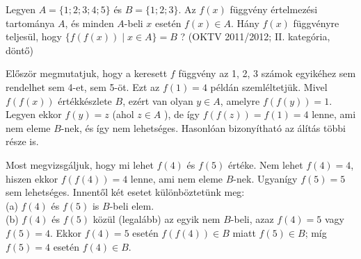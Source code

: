 \begin{extraproblem}
	Legyen $A=\{1;2;3;4;5\}$ és $B=\{1;2;3\}$. Az $f(x)$ függvény
	értelmezési tartománya $A$, és minden $A$-beli $x$ esetén $f(x)\in A$.
	Hány $f(x)$ függvényre teljesül, hogy $\{f(f(x))\mid x\in A\}=B$
	? (OKTV 2011/2012; II. kategória, döntő) 
\end{extraproblem}
\begin{solution}
	Először megmutatjuk, hogy a keresett $f$ függvény az 1, 2, 3 számok
	egyikéhez sem rendelhet sem 4-et, sem 5-öt. Ezt az $f(1)=4$ példán
	szemléltetjük. Mivel $f(f(x))$ értékkészlete $B$, ezért van olyan
	$y\in A$, amelyre $f(f(y))=1$. Legyen ekkor $f(y)=z$ (ahol $z\in A$
	), de így $f(f(z))=f(1)=4$ lenne, ami nem eleme $B$-nek, és így
	nem lehetséges. Hasonlóan bizonyítható az álítás többi része is.
	
	Most megvizsgáljuk, hogy mi lehet $f(4)$ és $f(5)$ értéke. Nem lehet
	$f(4)=4$, hiszen ekkor $f(f(4))=4$ lenne, ami nem eleme $B$-nek.
	Ugyanígy $f(5)=5$ sem lehetséges. Innentől két esetet különböztetünk
	meg:\\
	(a) $f(4)$ és $f(5)$ is $B$-beli elem.\\
	(b) $f(4)$ és $f(5)$ közül (legalább) az egyik nem $B$-beli, azaz
	$f(4)=5$ vagy $f(5)=4$. Ekkor $f(4)=5$ esetén $f(f(4))\in B$ miatt
	$f(5)\in B$; míg $f(5)=4$ esetén $f(4)\in B$.
	

\end{solution}
